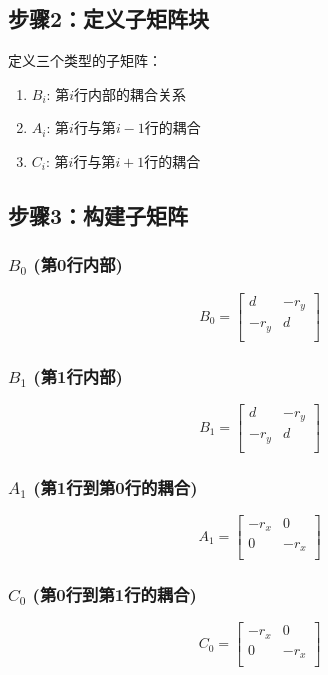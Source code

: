 \documentclass[UTF8]{ctexart}
\begin{document}
\subsection{步骤2：定义子矩阵块}

定义三个类型的子矩阵：
\begin{enumerate}
\item $B_i$: 第$i$行内部的耦合关系
\item $A_i$: 第$i$行与第$i-1$行的耦合
\item $C_i$: 第$i$行与第$i+1$行的耦合
\end{enumerate}

\subsection{步骤3：构建子矩阵}

\subsubsection{$B_0$ (第0行内部)}
$$
B_0 =
\begin{bmatrix}
d & -r_y \\
-r_y & d \\
\end{bmatrix}
$$

\subsubsection{$B_1$ (第1行内部)}
$$
B_1 =
\begin{bmatrix}
d & -r_y \\
-r_y & d \\
\end{bmatrix}
$$

\subsubsection{$A_1$ (第1行到第0行的耦合)}
$$
A_1 =
\begin{bmatrix}
-r_x & 0 \\
0 & -r_x \\
\end{bmatrix}
$$

\subsubsection{$C_0$ (第0行到第1行的耦合)}
$$
C_0 =
\begin{bmatrix}
-r_x & 0 \\
0 & -r_x \\
\end{bmatrix}
$$
\end{document}
